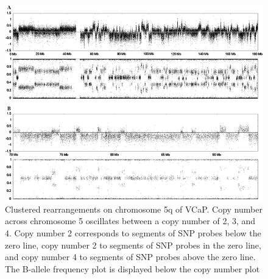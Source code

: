 \begin{figure}
    \includegraphics[width=\textwidth]{chapters/images/vcap/gnuplots.png}
    \caption{Clustered rearrangements on chromosome 5q of VCaP. Copy number across chromosome 5 oscillates between a copy number of 2, 3, and 4. Copy number 2 corresponds to segments of SNP probes below the zero line, copy number 2 to segments of SNP probes in the zero line, and copy number 4 to segments of SNP probes above the zero line. The B-allele frequency plot is displayed below the copy number plot}
    \label{fig:vcap-gnuplot}
\end{figure}

